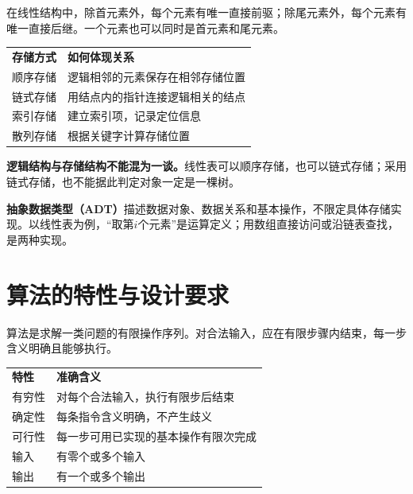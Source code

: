 \hypertarget{ds1-linear-note}{}

在线性结构中，除首元素外，每个元素有唯一直接前驱；除尾元素外，每个元素有唯一直接后继。一个元素也可以同时是首元素和尾元素。


\hypertarget{ds1-storage}{}

\par\smallskip\noindent\begin{tabularx}{\linewidth}{@{}YY@{}}\toprule
{} \textbf{存储方式} & \textbf{如何体现关系} \\
顺序存储 & 逻辑相邻的元素保存在相邻存储位置 \\
链式存储 & 用结点内的指针连接逻辑相关的结点 \\
索引存储 & 建立索引项，记录定位信息 \\
散列存储 & 根据关键字计算存储位置 \\\bottomrule\end{tabularx}\par\smallskip

\hypertarget{ds1-not-equal}{}

\begin{pitfall}[关系与实现]
\textbf{逻辑结构与存储结构不能混为一谈。}线性表可以顺序存储，也可以链式存储；采用链式存储，也不能据此判定对象一定是一棵树。
\end{pitfall}

\hypertarget{ds1-adt}{}

\textbf{抽象数据类型（ADT）}描述数据对象、数据关系和基本操作，不限定具体存储实现。以线性表为例，“取第$i$个元素”是运算定义；用数组直接访问或沿链表查找，是两种实现。


\hypertarget{ds1-algorithm}{}

\section{算法的特性与设计要求}\label{ds1-algorithm}

\hypertarget{ds1-algorithm-def}{}

\begin{definition}[算法]
算法是求解一类问题的有限操作序列。对合法输入，应在有限步骤内结束，每一步含义明确且能够执行。
\end{definition}

\hypertarget{ds1-five}{}

\par\smallskip\noindent\begin{tabularx}{\linewidth}{@{}YY@{}}\toprule
{} \textbf{特性} & \textbf{准确含义} \\
有穷性 & 对每个合法输入，执行有限步后结束 \\
确定性 & 每条指令含义明确，不产生歧义 \\
可行性 & 每一步可用已实现的基本操作有限次完成 \\
输入 & 有零个或多个输入 \\
输出 & 有一个或多个输出 \\\bottomrule\end{tabularx}\par\smallskip

